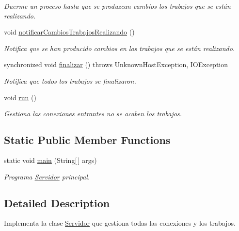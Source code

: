 \begin{DoxyCompactItemize}
\begin{DoxyCompactList}\small\item\em Duerme un proceso hasta que se produzcan cambios los trabajos que se están realizando. \end{DoxyCompactList}\item 
void \hyperlink{classServidor_a7dcc9a8eaf0ab0e7eedd0fb41c03849c}{notificar\+Cambios\+Trabajos\+Realizando} ()
\begin{DoxyCompactList}\small\item\em Notifica que se han producido cambios en los trabajos que se están realizando. \end{DoxyCompactList}\item 
synchronized void \hyperlink{classServidor_a6dda49cac122c1933278bae21641bff4}{finalizar} ()  throws Unknown\+Host\+Exception, I\+O\+Exception 
\begin{DoxyCompactList}\small\item\em Notifica que todos los trabajos se finalizaron. \end{DoxyCompactList}\item 
void \hyperlink{classServidor_a24622869d200039d3e0df70b6e29eb9e}{run} ()
\begin{DoxyCompactList}\small\item\em Gestiona las conexiones entrantes no se acaben los trabajos. \end{DoxyCompactList}\end{DoxyCompactItemize}
\subsection*{Static Public Member Functions}
\begin{DoxyCompactItemize}
\item 
static void \hyperlink{classServidor_a4f1d3d541947003e9c4db0b0ad40bd1d}{main} (String\mbox{[}$\,$\mbox{]} args)
\begin{DoxyCompactList}\small\item\em Programa \hyperlink{classServidor}{Servidor} principal. \end{DoxyCompactList}\end{DoxyCompactItemize}


\subsection{Detailed Description}
Implementa la clase \hyperlink{classServidor}{Servidor} que gestiona todas las conexiones y los trabajos. 

